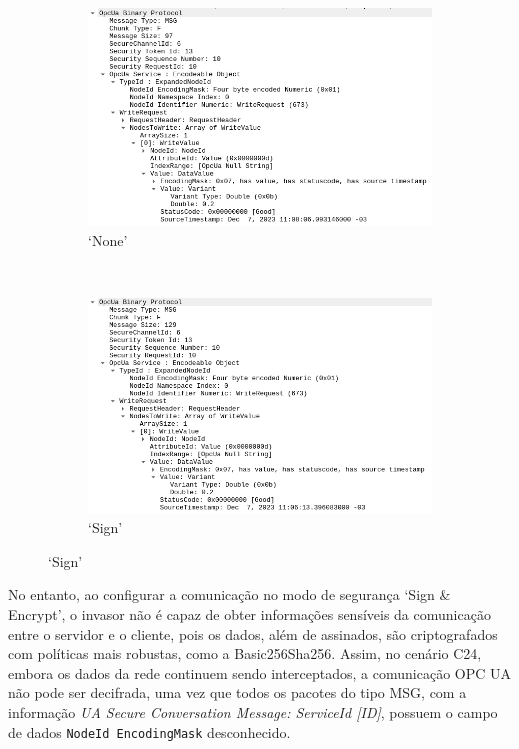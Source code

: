         \begin{figure}[htbp!]
            \centering
            \caption{\label{fig:writeRequest}Informações obtidas pelo invasor com modo de segurança `None' e `Sign'}
            \begin{subfigure}[t]{0.5\textwidth}
                \centering
                \caption{`None'}
                \includegraphics[width=1\textwidth]{USPSC-img/0-sniffing-WriteRequest.png}
            \end{subfigure}%
            ~ 
            \begin{subfigure}[t]{0.5\textwidth}
                \centering
                \caption{`Sign'}
                \includegraphics[width=1\textwidth]{USPSC-img/1-sniffing-WriteRequest.png}
            \end{subfigure}%
        \end{figure}

        No entanto, ao configurar a comunicação no modo de segurança `Sign \& Encrypt', o invasor não é capaz de obter informações sensíveis da comunicação entre o servidor e o cliente, pois os dados, além de assinados, são criptografados com políticas mais robustas, como a Basic256Sha256. Assim, no cenário C24, embora os dados da rede continuem sendo interceptados, a comunicação OPC UA não pode ser decifrada, uma vez que todos os pacotes do tipo MSG, com a informação \textit{UA Secure Conversation Message: ServiceId [ID]}, possuem o campo de dados \texttt{NodeId EncodingMask} desconhecido.

